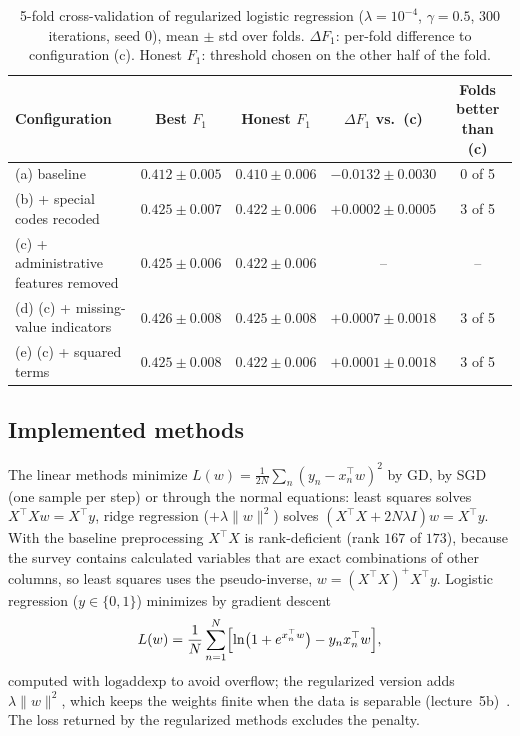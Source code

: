 \documentclass[10pt,conference,compsocconf]{IEEEtran}
\begin{document}
\begin{table}[t]
  \centering
  \footnotesize
  \renewcommand{\arraystretch}{1.1}
  \caption{5-fold cross-validation of regularized logistic regression
  ($\lambda=10^{-4}$, $\gamma=0.5$, $300$ iterations, seed $0$), mean $\pm$
  std over folds. $\Delta F_1$: per-fold difference to configuration (c).
  Honest $F_1$: threshold chosen on the other half of the fold.}
  \label{tab:cv}
  \begin{tabular}{|l|c|c|c|c|}
    \hline
    Configuration & Best $F_1$ & Honest $F_1$ & $\Delta F_1$ vs.\ (c)
      & Folds better than (c)\\
    \hline
    (a) baseline & $0.412 \pm 0.005$ & $0.410 \pm 0.006$
      & $-0.0132 \pm 0.0030$ & 0 of 5\\
    (b) + special codes recoded & $0.425 \pm 0.007$ & $0.422 \pm 0.006$
      & $+0.0002 \pm 0.0005$ & 3 of 5\\
    (c) + administrative features removed & $0.425 \pm 0.006$
      & $0.422 \pm 0.006$ & -- & --\\
    (d) (c) + missing-value indicators & $0.426 \pm 0.008$
      & $0.425 \pm 0.008$ & $+0.0007 \pm 0.0018$ & 3 of 5\\
    (e) (c) + squared terms & $0.425 \pm 0.008$ & $0.422 \pm 0.006$
      & $+0.0001 \pm 0.0018$ & 3 of 5\\
    \hline
  \end{tabular}
\end{table}

\subsection{Implemented methods}

The linear methods minimize
$L(w)=\frac{1}{2N}\sum_n (y_n-x_n^\top w)^2$ by GD, by SGD (one sample
per step) or through the normal equations: least squares solves
$X^\top Xw=X^\top y$, ridge regression ($+\lambda\|w\|^2$) solves
$(X^\top X+2N\lambda I)w=X^\top y$. With the baseline preprocessing
$X^\top X$ is rank-deficient (rank $167$ of $173$), because the survey
contains calculated variables that are exact combinations of other
columns, so least squares uses the pseudo-inverse,
$w=(X^\top X)^{+}X^\top y$. Logistic regression ($y\in\{0,1\}$)
minimizes by gradient descent
\begin{equation}
  L(w)=\frac1N\sum_{n=1}^{N}\Bigl[\ln\bigl(1+e^{x_n^\top w}\bigr)-y_n x_n^\top w\Bigr],
\end{equation}
computed with $\text{logaddexp}$ to avoid overflow; the regularized
version adds $\lambda\|w\|^2$, which keeps the weights finite when the
data is separable (lecture~5b)~\cite{cs433}. The loss returned by the
regularized methods excludes the penalty.
\end{document}
